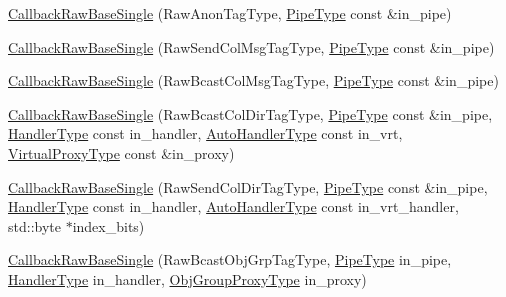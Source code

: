 \begin{DoxyCompactItemize}
\item 
\hyperlink{structvt_1_1pipe_1_1callback_1_1cbunion_1_1_callback_raw_base_single_a2586495207c03c2fb5247e19ee189984}{Callback\+Raw\+Base\+Single} (Raw\+Anon\+Tag\+Type, \hyperlink{namespacevt_ac9852acda74d1896f48f406cd72c7bd3}{Pipe\+Type} const \&in\+\_\+pipe)
\item 
\hyperlink{structvt_1_1pipe_1_1callback_1_1cbunion_1_1_callback_raw_base_single_ada70fbd67b17be3a4eb86fd497b2c409}{Callback\+Raw\+Base\+Single} (Raw\+Send\+Col\+Msg\+Tag\+Type, \hyperlink{namespacevt_ac9852acda74d1896f48f406cd72c7bd3}{Pipe\+Type} const \&in\+\_\+pipe)
\item 
\hyperlink{structvt_1_1pipe_1_1callback_1_1cbunion_1_1_callback_raw_base_single_a1bdc68ca7ce795dc6acbc0b42a97216f}{Callback\+Raw\+Base\+Single} (Raw\+Bcast\+Col\+Msg\+Tag\+Type, \hyperlink{namespacevt_ac9852acda74d1896f48f406cd72c7bd3}{Pipe\+Type} const \&in\+\_\+pipe)
\item 
\hyperlink{structvt_1_1pipe_1_1callback_1_1cbunion_1_1_callback_raw_base_single_a750671c1804c21f4cd981f7a27d7177a}{Callback\+Raw\+Base\+Single} (Raw\+Bcast\+Col\+Dir\+Tag\+Type, \hyperlink{namespacevt_ac9852acda74d1896f48f406cd72c7bd3}{Pipe\+Type} const \&in\+\_\+pipe, \hyperlink{namespacevt_af64846b57dfcaf104da3ef6967917573}{Handler\+Type} const in\+\_\+handler, \hyperlink{structvt_1_1pipe_1_1callback_1_1cbunion_1_1_callback_raw_base_single_a734a9c83099de5bc1cd85f9da8dba7bb}{Auto\+Handler\+Type} const in\+\_\+vrt, \hyperlink{namespacevt_a1b417dd5d684f045bb58a0ede70045ac}{Virtual\+Proxy\+Type} const \&in\+\_\+proxy)
\item 
\hyperlink{structvt_1_1pipe_1_1callback_1_1cbunion_1_1_callback_raw_base_single_a7f5a0dad5b0f49a42d4ac58cd5db6894}{Callback\+Raw\+Base\+Single} (Raw\+Send\+Col\+Dir\+Tag\+Type, \hyperlink{namespacevt_ac9852acda74d1896f48f406cd72c7bd3}{Pipe\+Type} const \&in\+\_\+pipe, \hyperlink{namespacevt_af64846b57dfcaf104da3ef6967917573}{Handler\+Type} const in\+\_\+handler, \hyperlink{structvt_1_1pipe_1_1callback_1_1cbunion_1_1_callback_raw_base_single_a734a9c83099de5bc1cd85f9da8dba7bb}{Auto\+Handler\+Type} const in\+\_\+vrt\+\_\+handler, std\+::byte $\ast$index\+\_\+bits)
\item 
\hyperlink{structvt_1_1pipe_1_1callback_1_1cbunion_1_1_callback_raw_base_single_a2ff2eebe15a6b270473f61cfa2a9804a}{Callback\+Raw\+Base\+Single} (Raw\+Bcast\+Obj\+Grp\+Tag\+Type, \hyperlink{namespacevt_ac9852acda74d1896f48f406cd72c7bd3}{Pipe\+Type} in\+\_\+pipe, \hyperlink{namespacevt_af64846b57dfcaf104da3ef6967917573}{Handler\+Type} in\+\_\+handler, \hyperlink{namespacevt_ad7cae989df485fccca57f0792a880a8e}{Obj\+Group\+Proxy\+Type} in\+\_\+proxy)

\end{DoxyCompactItemize}
